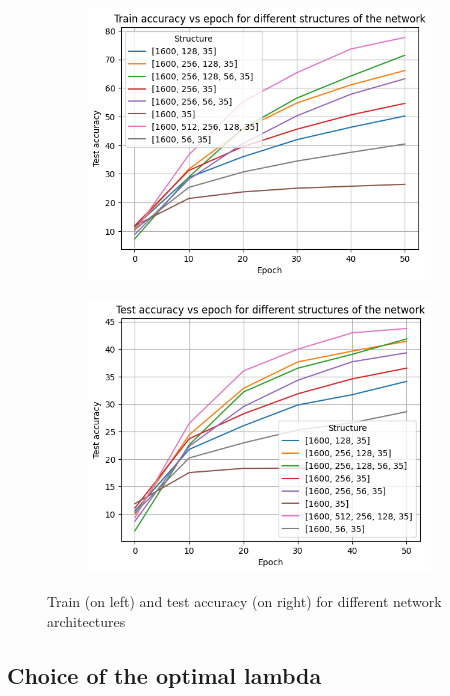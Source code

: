 \documentclass[eng]{class}
\begin{document}
\begin{figure}[h]
  \begin{subfigure}{.5\linewidth}
    \includegraphics[width=.8\columnwidth]{images/train_structure.png}
  \end{subfigure}%
  \begin{subfigure}{.5\linewidth}
    \includegraphics[width=.8\columnwidth]{images/test_structure.png}
  \end{subfigure}
  \caption{Train (on left) and test accuracy (on right) for different network architectures}
  \label{fig-3}
\end{figure}

\subsection{Choice of the optimal lambda}
\end{document}
